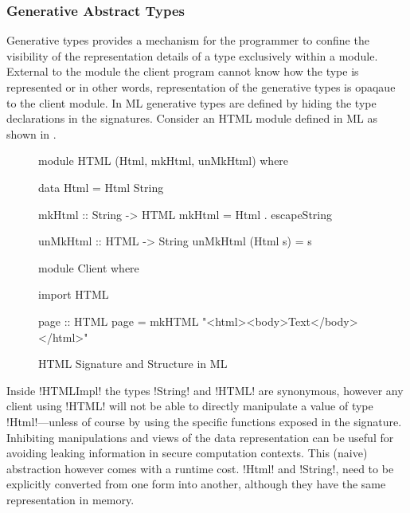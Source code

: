 \documentclass[manuscript,screen,nonacm]{acmart}
\begin{document}
\subsubsection{Generative Abstract Types}
Generative types provides a mechanism for the programmer to confine the visibility of the representation details of a type exclusively within a module. External to the module the client program cannot know how the type is represented or in other words, representation of the generative types is opaqaue to the client module. In ML generative types are defined by hiding the type declarations in the signatures. Consider an HTML module defined in ML as shown in .

\begin{figure}[ht]
  \centering
  \begin{minipage}[ht]{0.4\linewidth}
    \begin{code}
      module HTML (Html, mkHtml, unMkHtml)
      where

      data Html = Html String

      mkHtml :: String -> HTML
      mkHtml = Html . escapeString

      unMkHtml :: HTML -> String
      unMkHtml (Html s) = s
    \end{code}
  \end{minipage}%
  \begin{minipage}[ht]{0.4\linewidth}
    \begin{code}
      module Client
      where

      import HTML

      page :: HTML
      page = mkHTML "<html><body>Text</body></html>"



    \end{code}
  \end{minipage}
  \caption{HTML Signature and Structure in ML}
  \label{fig:ml-generative-type}
\end{figure}

Inside !HTMLImpl! the types !String! and !HTML! are synonymous, however any client using !HTML! will not be able to directly manipulate a value of type !Html!---unless of course by using the specific functions exposed in the signature. Inhibiting manipulations and views of the data representation can be useful for avoiding leaking information in secure computation contexts. This (naive) abstraction however comes with a runtime cost. !Html! and !String!, need to be explicitly converted from one form into another, although they have the same representation in memory.
\end{document}
